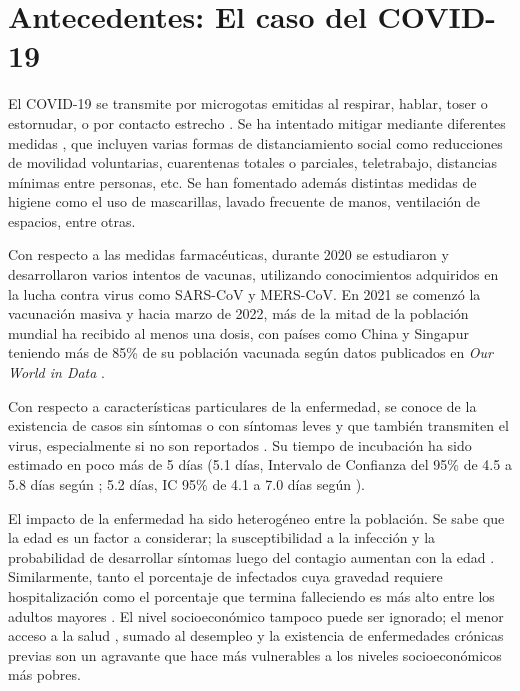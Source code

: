 \section{Antecedentes: El caso del COVID-19} \label{sec:antecedentes}

El COVID-19 se transmite por microgotas emitidas al respirar, hablar, toser o estornudar, o por contacto estrecho \cite{Dong2020}\cite{Greenhalgh2021}. Se ha intentado mitigar mediante diferentes medidas \cite{Flaxman2020}\cite{Castillo-Laborde2021}, que incluyen varias formas de distanciamiento social como reducciones de movilidad voluntarias, cuarentenas totales o parciales, teletrabajo, distancias mínimas entre personas, etc. Se han fomentado además distintas medidas de higiene como el uso de mascarillas, lavado frecuente de manos, ventilación de espacios, entre otras.

Con respecto a las medidas farmacéuticas, durante 2020 se estudiaron y desarrollaron varios intentos de vacunas, utilizando conocimientos adquiridos en la lucha contra virus como SARS-CoV y MERS-CoV. En 2021 se comenzó la vacunación masiva y hacia marzo de 2022, más de la mitad de la población mundial ha recibido al menos una dosis, con países como China y Singapur teniendo más de 85\% de su población vacunada según datos publicados en \textit{Our World in Data} \cite{Mathieu2021}.

Con respecto a características particulares de la enfermedad, se conoce de la existencia de casos sin síntomas o con síntomas leves y que también transmiten el virus, especialmente si no son reportados \cite{Li2020c}\cite{Byambasuren2020}\cite{Gao2021}. Su tiempo de incubación ha sido estimado en poco más de 5 días (5.1 días, Intervalo de Confianza del 95\% de 4.5 a 5.8 días según \cite{Lauer2020}; 5.2 días, IC 95\% de 4.1 a 7.0 días según \cite{Li2020d}). 

El impacto de la enfermedad ha sido heterogéneo entre la población. Se sabe que la edad es un factor a considerar; la susceptibilidad a la infección y la probabilidad de desarrollar síntomas luego del contagio aumentan con la edad \cite{Davies2020}. Similarmente, tanto el porcentaje de infectados cuya gravedad requiere hospitalización como el porcentaje que termina falleciendo es más alto entre los adultos mayores \cite{Verity2020}. El nivel socioeconómico tampoco puede ser ignorado; el menor acceso a la salud \cite{Wang2020}, sumado al desempleo y la existencia de enfermedades crónicas previas \cite{Ahmed2020} son un agravante que hace más vulnerables a los niveles socioeconómicos más pobres.

